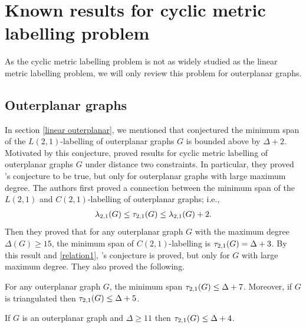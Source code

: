 





\section{Known results for cyclic metric labelling problem} 
As the cyclic metric labelling problem is not as widely studied as the linear metric labelling problem, we will only review this problem for outerplanar graphs. 
\subsection{Outerplanar graphs}

In section \ref{linear outerplanar}, we mentioned that \cite{bodlaender04} conjectured the minimum span of the $L(2,1)$-labelling of outerplanar graphs $G$ is bounded above by $\Delta+2$. Motivated by this conjecture, \cite{liu05} proved results for cyclic metric labelling of outerplanar graphs $G$ under distance two constraints. In particular, they proved \citeauthor{bodlaender04}'s conjecture to be true, but only for outerplanar graphs with large maximum degree. The authors first proved a connection between the minimum span of the $L(2,1)$ and $C(2,1)$-labelling of outerplanar graphs; i.e.,  
\begin{align}
\label{relation1}
\lambda_{2,1}(G) \le \tau_{2,1}(G) \le \lambda_{2,1}(G) +2.
\end{align}
Then they proved that for any outerplanar graph $G$ with the maximum degree $\Delta(G) \ge 15$, the minimum span of $C(2,1)$-labelling is $\tau_{2,1}(G) = \Delta+3$. By this result and \eqref{relation1}, \citeauthor{bodlaender04}'s conjecture is proved, but only for $G$ with large maximum degree. They also proved the following.
\begin{theorem}
For any outerplanar graph $G$, the minimum span  $\tau_{2,1}(G) \le \Delta+7$. Moreover, if $G$ is triangulated then $\tau_{2,1}(G) \le \Delta +5$. 
\end{theorem}
\begin{theorem}
If $G$ is an outerplanar graph and $\Delta \ge 11$ then $\tau_{2,1}(G) \le \Delta + 4$. 
\end{theorem}

